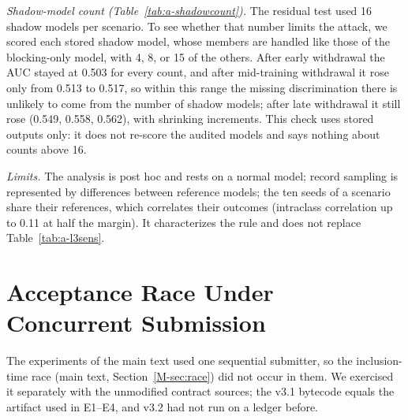 

\emph{Shadow-model count (Table~\ref{tab:a-shadowcount}).} The residual test used 16 shadow models per scenario. To see whether that number limits the attack, we scored each stored shadow model, whose members are handled like those of the blocking-only model, with 4, 8, or 15 of the others. After early withdrawal the AUC stayed at 0.503 for every count, and after mid-training withdrawal it rose only from 0.513 to 0.517, so within this range the missing discrimination there is unlikely to come from the number of shadow models; after late withdrawal it still rose (0.549, 0.558, 0.562), with shrinking increments. This check uses stored outputs only: it does not re-score the audited models and says nothing about counts above 16.



\emph{Limits.} The analysis is post hoc and rests on a normal model; record sampling is represented by differences between reference models; the ten seeds of a scenario share their references, which correlates their outcomes (intraclass correlation up to 0.11 at half the margin). It characterizes the rule and does not replace Table~\ref{tab:a-l3sens}.

\section{Acceptance Race Under Concurrent Submission}
\label{app:race}
The experiments of the main text used one sequential submitter, so the inclusion-time race (main text, Section~\ref{M-sec:race}) did not occur in them. We exercised it separately with the unmodified contract sources; the v3.1 bytecode equals the artifact used in E1--E4, and v3.2 had not run on a ledger before.

